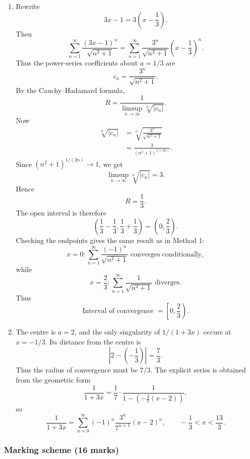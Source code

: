 \documentclass[12pt]{article}
\newcommand{\abs}[1]{\left|#1\right|}
\begin{document}
\begin{enumerate}[label=(\alph*)]
\item Rewrite
\[
3x-1=3\left(x-\frac13\right).
\]
Then
\[
\sum_{n=1}^{\infty}\frac{(3x-1)^n}{\sqrt{n^2+1}}
=\sum_{n=1}^{\infty}\frac{3^n}{\sqrt{n^2+1}}\left(x-\frac13\right)^n.
\]
Thus the power-series coefficients about $a=1/3$ are
\[
c_n=\frac{3^n}{\sqrt{n^2+1}}.
\]
By the Cauchy--Hadamard formula,
\[
R=\frac{1}{\limsup\limits_{n\to\infty}\sqrt[n]{\abs{c_n}}}.
\]
Now
\begin{align*}
\sqrt[n]{\abs{c_n}}
&=\sqrt[n]{\frac{3^n}{\sqrt{n^2+1}}} \\
&=\frac{3}{(n^2+1)^{1/(2n)}}.
\end{align*}
Since $(n^2+1)^{1/(2n)}\to 1$, we get
\[
\limsup_{n\to\infty}\sqrt[n]{\abs{c_n}}=3.
\]
Hence
\[
R=\frac13.
\]
The open interval is therefore
\[
\left(\frac13-\frac13,\frac13+\frac13\right)=\left(0,\frac23\right).
\]
Checking the endpoints gives the same result as in Method 1:
\[
x=0: \sum_{n=1}^{\infty}\frac{(-1)^n}{\sqrt{n^2+1}}\text{ converges conditionally},
\]
while
\[
x=\frac23: \sum_{n=1}^{\infty}\frac{1}{\sqrt{n^2+1}}\text{ diverges}.
\]
Thus
\[
\boxed{\text{Interval of convergence }=\left[0,\frac23\right).}
\]

\item The centre is $a=2$, and the only singularity of $1/(1+3x)$ occurs at $x=-1/3$. Its distance from the centre is
\[
\abs{2-\left(-\frac13\right)}=\frac73.
\]
Thus the radius of convergence must be $7/3$. The explicit series is obtained from the geometric form
\[
\frac{1}{1+3x}=\frac17\cdot \frac{1}{1-\left(-\frac37(x-2)\right)},
\]
so
\[
\boxed{\displaystyle
\frac{1}{1+3x}=\sum_{n=0}^{\infty}(-1)^n\frac{3^n}{7^{n+1}}(x-2)^n,
\qquad -\frac13<x<\frac{13}{3}.}
\]
\end{enumerate}

\subsubsection{Marking scheme (16 marks)}
\end{document}
